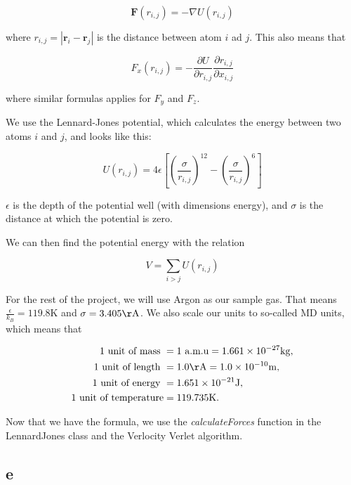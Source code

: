 \documentclass[10pt,showpacs,preprintnumbers,footinbib,amsmath,amssymb,aps,prl,twocolumn,groupedaddress,superscriptaddress,showkeys]{revtex4-1}
\newcommand{\pd}[2]{\frac{\partial#1}{\partial #2}}
\begin{document}
\begin{equation}
\textbf{F}(r_{i,j}) = -\nabla U(r_{i,j})
\end{equation}

where $r_{i,j} = | \textbf{r}_i - \textbf{r}_j |$ is the distance between atom $i$ ad $j$. This also means that

\begin{equation}
F_x(r_{i,j}) = -\pd{U}{r_{i,j}}\pd{r_{i,j}}{x_{i,j}}
\end{equation}

where similar formulas applies for $F_y$ and $F_z$.

 We use the Lennard-Jones potential, which calculates the energy between two atoms $i$ and $j$, and looks like this:

\begin{equation}
U(r_{i,j}) = 4\epsilon\left[ \left( \frac{\sigma}{r_{i,j}} \right)^{12} - \left( \frac{\sigma}{r_{i,j}} \right)^6 \right]
\end{equation}

$\epsilon$ is the depth of the potential well (with dimensions energy), and $\sigma$ is the distance at which the potential is zero.

We can then find the potential energy with the relation

\begin{equation}
V = \sum_{i > j}U(r_{i,j})
\end{equation}

For the rest of the project, we will use Argon as our sample gas. That means $\frac{\epsilon}{k_B} = 119.8\mathrm{K}$ and $\sigma = 3.405\mathrm{\AA}$. We also scale our units to so-called MD units, which means that

\begin{align}
	\text{1 unit of mass } &= 1 \text{ a.m.u} = 1.661\times 10^{-27}\mathrm{kg},\\
	\text{1 unit of length } &= 1.0 \mathrm{\AA} = 1.0\times 10^{-10}\mathrm{m},\\
	\text{1 unit of energy } &= 1.651\times 10^{-21}\mathrm{J},\\
	\text{1 unit of temperature} &= 119.735\mathrm{K}.
\end{align}

Now that we have the formula, we use the \textit{calculateForces} function in the LennardJones class and the Verlocity Verlet algorithm.



\subsection*{e}
\end{document}

